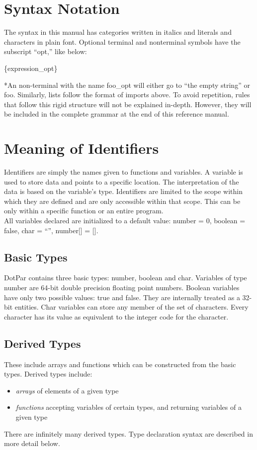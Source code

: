 \section{Syntax Notation}
The syntax in this manual has categories written in italics and literals and characters in
plain font. Optional terminal and nonterminal symbols have the subscript ``opt,'' like below:

\centerline{\{expression\_opt\}}

*An non-terminal with the name foo\_opt will either go to ``the empty string'' or foo. Similarly, lists follow the format of imports above. To avoid repetition, rules that follow this rigid structure will not be explained in-depth. However, they will be included in the complete grammar at the end of this reference manual.
\section{Meaning of Identifiers}
Identifiers are simply the names given to functions and variables. A variable is used to store data and points to a specific location. The interpretation of the data is based on the variable's type. Identifiers are limited to the scope within which they are defined and are only accessible within that scope. This can be only within a specific function or an entire program.
\\All variables declared are initialized to a default value: number = 0, boolean = false, char = ``'', number[] = [].
\subsection{Basic Types}
DotPar contains three basic types: number, boolean and char. Variables of type number are 64-bit double precision floating point numbers. Boolean variables have only two possible values: true and false. They are internally treated as a 32-bit entities. Char variables can store any member of the set of characters. Every character has its value as equivalent to the integer code for the character.
\subsection{Derived Types}
These include arrays and functions which can be constructed from the basic types. Derived types include:
\begin{itemize}
\item
\emph{arrays} of elements of a given type
\item
\emph{functions} accepting variables of certain types, and returning variables of a given type
\end{itemize}
There are infinitely many derived types. Type declaration syntax are described in more detail below.

